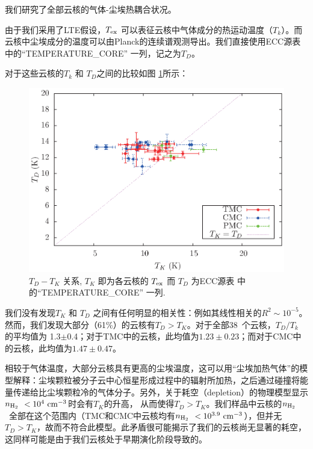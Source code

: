 \documentclass[UTF8, nocolorlinks]{pkuthss}
\newcommand{\texc}{$T_{\rm {ex}}$ }
\newcommand{\nnhyd}{$n_{\rm H_2}$\ }
\newcommand{\numcore}{38\ }
\begin{document}
		我们研究了全部云核的气体-尘埃热耦合状况。

		由于我们采用了LTE假设，\texc 可以表征云核中气体成分的热运动温度（$T_k$）。而云核中尘埃成分的温度可以由Planck的连续谱观测导出。我们直接使用ECC源表中的“TEMPERATURE\_CORE” 一列\supercite{2011yCat.8088....0P}，记之为$T_D$。

		对于这些云核的$T_k$ 和 $T_D$之间的比较如图 \ref{Fig.GasDust}所示：
		
		\begin{figure}[htbp]
		\begin{center}
			\includegraphics[totalheight=62mm]{img_plot/Gas-Dust_EB_Core.eps}
			\caption{$T_D-T_K$ 关系, $T_K$ 即为各云核的 \texc 而 $T_D$ 为ECC源表\supercite{2011yCat.8088....0P} 中的“TEMPERATURE\_CORE” 一列.\label{Fig.GasDust}}
		\end{center}
		\end{figure}
		
		我们没有发现$T_K$ 和 $T_D$ 之间有任何明显的相关性：例如其线性相关的$R^2\sim 10^{-5}$。 然而，我们发现大部分（61\%）的云核有$T_D>T_K$。对于全部\numcore 个云核，$T_D/T_k$ 的平均值为 1.3$\pm$0.4；对于TMC中的云核，此均值为$1.23\pm0.23$；而对于CMC中的云核，此均值为$1.47\pm0.47$。

		相较于气体温度，大部分云核具有更高的尘埃温度，这可以用“尘埃加热气体”的模型解释：尘埃颗粒被分子云中心恒星形成过程中的辐射所加热，之后通过碰撞将能量传递给比尘埃颗粒冷的气体分子\supercite{1974ApJ...189..441G}。另外，关于耗空（depletion）的物理模型\supercite{2001ApJ...557..736G}显示\nnhyd $<10^{4}\rm\ cm^{-3}$时会有$T_K$的升高， 从而使得$T_D>T_K$。我们样品中云核的\nnhyd 全部在这个范围内（TMC和CMC中云核均有\nnhyd $<10^{3.9}\rm\ cm^{-3}$），但并无$T_D>T_K$，故而不符合此模型。此矛盾很可能揭示了我们的云核尚无显著的耗空，这同样可能是由于我们云核处于早期演化阶段导致的。
\end{document}
